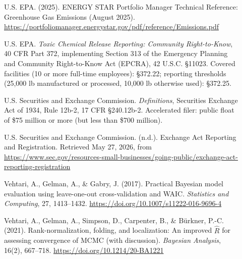 \begin{description}
\item[] \hypertarget{epa2025}{}U.S. EPA. (2025). ENERGY STAR Portfolio Manager Technical Reference: Greenhouse Gas Emissions (August 2025). \url{https://portfoliomanager.energystar.gov/pdf/reference/Emissions.pdf}
\item[] U.S. EPA. \textit{Toxic Chemical Release Reporting: Community Right-to-Know}, 40 CFR Part 372, implementing Section 313 of the Emergency Planning and Community Right-to-Know Act (EPCRA), 42 U.S.C. §11023. Covered facilities (10 or more full-time employees): §372.22; reporting thresholds (25,000 lb manufactured or processed, 10,000 lb otherwise used): §372.25.
\item[] U.S. Securities and Exchange Commission. \textit{Definitions}, Securities Exchange Act of 1934, Rule 12b-2, 17 CFR §240.12b-2. Accelerated filer: public float of \$75 million or more (but less than \$700 million).
\item[] \hypertarget{securitiesnd}{}U.S. Securities and Exchange Commission. (n.d.). Exchange Act Reporting and Registration. Retrieved May 27, 2026, from \url{https://www.sec.gov/resources-small-businesses/going-public/exchange-act-reporting-registration}
\item[] \hypertarget{vehtarietal2017}{}Vehtari, A., Gelman, A., \& Gabry, J. (2017). Practical Bayesian model evaluation using leave-one-out cross-validation and WAIC. \textit{Statistics and Computing}, 27, 1413--1432. \url{https://doi.org/10.1007/s11222-016-9696-4}
\item[] \hypertarget{vehtarietal2021}{}Vehtari, A., Gelman, A., Simpson, D., Carpenter, B., \& Bürkner, P.-C. (2021). Rank-normalization, folding, and localization: An improved $\hat{R}$ for assessing convergence of MCMC (with discussion). \textit{Bayesian Analysis}, 16(2), 667--718. \url{https://doi.org/10.1214/20-BA1221}
\end{description}
